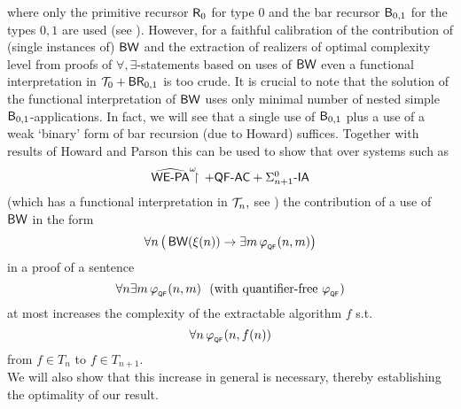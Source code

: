 where only the primitive recursor $\textsf{\upshape R}_0$ for type $0$ and the bar recursor 
$\textsf{\upshape B}_{0,1}$ for the 
types $0,1$ are used (see \cite{Kohlenbach99}). 
However, for a faithful calibration of the contribution of 
(single instances of) 
$\textsf{\upshape BW}$ and the extraction 
of realizers of optimal complexity level from proofs of 
$\forall,\exists$-statements based on uses of $\textsf{\upshape BW}$ even
a functional interpretation in $\mathcal{T}_0+\textsf{\upshape BR}_{0,1}$ is too crude. 
It is crucial to note that 
the solution of the functional interpretation of $\textsf{\upshape BW}$ uses only minimal 
number 
of nested simple $\textsf{\upshape B}_{0,1}$-applications. In fact, we will see that a single use 
of $\textsf{\upshape B}_{0,1}$ plus a use of a weak `binary' form of bar recursion (due 
to Howard) suffices. Together with results of Howard and Parson 
this can be used to show that over systems such as 
\[ \mbox{$\widehat{\textsf{\upshape WE-PA}}^\omega\!\!\!\restriction\,+\textsf{\upshape QF-}\textsf{\upshape AC}+\Sigma^0_{n+1}$-$\textsf{\upshape IA}$} \] (which has 
a functional interpretation in $\mathcal{T}_n,$ see \cite{Parsons72}) 
the contribution of a use of $\textsf{\upshape BW}$ in the form 
\[ \forall n\, \big(\,\mbox{$\textsf{\upshape BW}$}(\xi(n))\to\exists m\,
\varphi_{_{\textsf{\upshape QF}}}(n,m)\big)\] 
in a proof of a sentence 
\[ \forall n\exists m\,\phi_{_\QF}(n,m) \ \   \mbox{(with quantifier-free 
$\phi_{_\QF}$)} \] 
at most increases the complexity of the 
extractable algorithm $f$ s.t. 
\[ \forall n\, \varphi_{_{\textsf{\upshape QF}}}(n,f(n)) \] 
from $f\in T_n$ to $f\in T_{n+1}.$\\
We will also show that this increase 
in general is necessary, thereby establishing the 
optimality of our result.   
\\[1mm] 

